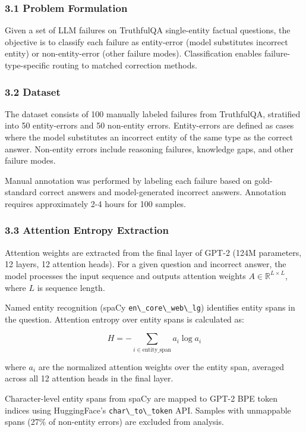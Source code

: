 
\subsubsection{3.1 Problem Formulation}

Given a set of LLM failures on TruthfulQA single-entity factual questions, the objective is to classify each failure as entity-error (model substitutes incorrect entity) or non-entity-error (other failure modes). Classification enables failure-type-specific routing to matched correction methods.

\subsubsection{3.2 Dataset}

The dataset consists of 100 manually labeled failures from TruthfulQA, stratified into 50 entity-errors and 50 non-entity errors. Entity-errors are defined as cases where the model substitutes an incorrect entity of the same type as the correct answer. Non-entity errors include reasoning failures, knowledge gaps, and other failure modes.

Manual annotation was performed by labeling each failure based on gold-standard correct answers and model-generated incorrect answers. Annotation requires approximately 2-4 hours for 100 samples.

\subsubsection{3.3 Attention Entropy Extraction}

Attention weights are extracted from the final layer of GPT-2 (124M parameters, 12 layers, 12 attention heads). For a given question and incorrect answer, the model processes the input sequence and outputs attention weights $A \in \mathbb{R}^{L \times L}$, where $L$ is sequence length.

Named entity recognition (spaCy \texttt{en\textbackslash \_core\textbackslash \_web\textbackslash \_lg}) identifies entity spans in the question. Attention entropy over entity spans is calculated as:

$$H = -\sum_{i \in \text{entity\_span}} a_i \log a_i$$

where $a_i$ are the normalized attention weights over the entity span, averaged across all 12 attention heads in the final layer.

Character-level entity spans from spaCy are mapped to GPT-2 BPE token indices using HuggingFace's \texttt{char\textbackslash \_to\textbackslash \_token} API. Samples with unmappable spans (27\% of non-entity errors) are excluded from analysis.

